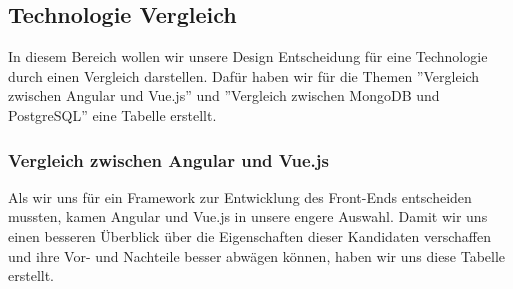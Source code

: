 \subsection{Technologie Vergleich}
In diesem Bereich wollen wir unsere Design Entscheidung für eine Technologie durch einen Vergleich darstellen.
Dafür haben wir für die Themen ''Vergleich zwischen Angular und Vue.js'' und ''Vergleich zwischen MongoDB und PostgreSQL'' eine Tabelle erstellt.

\subsubsection{Vergleich zwischen Angular und Vue.js}

Als wir uns für ein Framework zur Entwicklung des Front-Ends entscheiden mussten, kamen Angular und Vue.js in unsere engere Auswahl.
Damit wir uns einen besseren Überblick über die Eigenschaften dieser Kandidaten verschaffen und ihre Vor- und Nachteile besser abwägen können, 
haben wir uns diese Tabelle erstellt.

